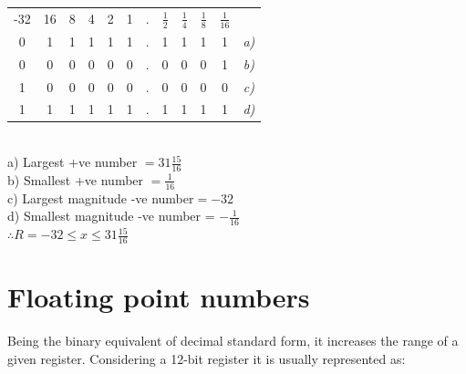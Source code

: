 \documentclass[12pt, a4paper]{report}
\begin{document}
\begin{itemize}
{			\begin{center}
				\begin{tabular}{cccccccccccc}
					-32 & 16 & 8 & 4 & 2 & 1 & . & $\frac{1}{2}$ & $\frac{1}{4}$ & $\frac{1}{8}$ & $\frac{1}{16}$ &             \\ \cline{1-11}
					0   & 1  & 1 & 1 & 1 & 1 & . & 1             & 1             & 1             & 1              & \textit{a)} \\ \cline{1-11}
					0   & 0  & 0 & 0 & 0 & 0 & . & 0             & 0             & 0             & 1              & \textit{b)} \\ \cline{1-11}
					1   & 0  & 0 & 0 & 0 & 0 & . & 0             & 0             & 0             & 0              & \textit{c)} \\ \cline{1-11}
					1   & 1  & 1 & 1 & 1 & 1 & . & 1             & 1             & 1             & 1              & \textit{d)} 
				\end{tabular}\\\bigskip
				a) Largest +ve number  $= 31 \frac{15}{16}$\\\bigskip
				b) Smallest +ve number  $= \frac{1}{16}$\\\bigskip
				c) Largest magnitude -ve number$= -32$\\\bigskip
				d) Smallest magnitude -ve number = $-\frac{1}{16}$\\
				$\therefore R = -32 \le x \le 31 \frac{15}{16}$
			\end{center}
		}
	\end{itemize}
	\newpage
	
	\section{Floating point numbers}
	\quad	Being the binary equivalent of decimal standard form, it increases the range of a given register. Considering a 12-bit register it is usually represented as:
	
\end{document}
